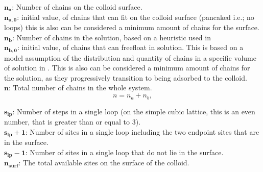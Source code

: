 \documentclass[12pt,letterpaper]{article}
\begin{document}
$
\boldsymbol{
    n_{a}
}
$: 
Number of chains on the colloid surface.\\

$
\boldsymbol{
    n_{a,0}
}
$: 
initial value, of chains that can fit on the colloid surface (pancaked i.e.; no loops) this is also can be considered a minimum amount of chains for the surface.\\

$
\boldsymbol{
    n_{b}
}
$: 
Number of chains in the solution, based on a heuristic used in \cite{koumarianos2021theory}\\

$
\boldsymbol{
    n_{b,0}
}
$: 
initial value, of chains that can freefloat in solution. This is based on a model assumption of the distribution and quantity of chains in a specific volume of solution in \cite{koumarianos2021theory}. This is also can be considered a minimum amount of chains for the solution, as they progressively transition to being adsorbed to the colloid.\\


$
\boldsymbol{
    n
}
$: 
Total number of chains in the whole system.
\begin{equation}
n=n_a+n_b,
	\label{eq. n}
\end{equation}

$
\boldsymbol{
    s_{lp}
}
$: 
Number of steps in a single loop (on the simple cubic lattice, this is an even number, that is greater than or equal to 3).\\

$
\boldsymbol{
    s_{lp}
    +
    1
}
$:  
Number of sites in a single loop including the two endpoint sites that are in the surface.\\

$
\boldsymbol{
    s_{lp}
    -
    1
}
$: 
Number of sites in a single loop that do not lie in the surface.\\





$
\boldsymbol{
    n_{surf}
}
$: 
The total available sites on the surface of the colloid.\\
\end{document}
